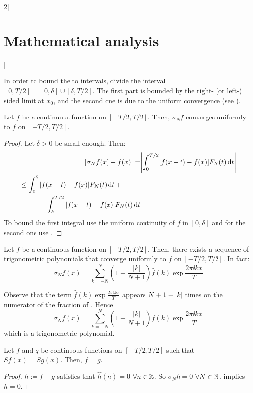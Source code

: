 \documentclass[../../../main_math.tex]{subfiles}
\begin{document}
\begin{multicols}{2}[\section{Mathematical analysis}]
\begin{sproof}
    In order to bound the to intervals, divide the interval $[0,T/2]=[0,\delta]\cup[\delta,T/2]$. The first part is bounded by the right- (or left-) sided limit at $x_0$, and the second one is due to the uniform convergence (see ).
  \end{sproof}
  \begin{theorem}\label{MA:fejerthm}
    Let $f$ be a continuous function on $[-T/2,T/2]$. Then, $\sigma_Nf$ converges uniformly to $f$ on $[-T/2,T/2]$.
  \end{theorem}
  \begin{proof}
    Let $\delta>0$ be small enough. Then:
    \begin{align*}
      \abs{\sigma_Nf(x)-f(x)}= & \abs{\int_0^{T/2}[f(x-t)-f(x)]F_N(t)\dd{t}} \\
      \begin{split}
        & \leq \int_0^{\delta}\abs{f(x-t)-f(x)}F_N(t)\dd{t}+\\
        &\hspace{1cm}+\int_\delta^{T/2}\abs{f(x-t)-f(x)}F_N(t)\dd{t}
      \end{split}
    \end{align*}
    To bound the first integral use the uniform continuity of $f$ in $[0,\delta]$ and for the second one use .
  \end{proof}
  \begin{corollary}
    Let $f$ be a continuous function on $[-T/2,T/2]$. Then, there exists a sequence of trigonometric polynomials that converge uniformly to $f$ on $[-T/2,T/2]$. In fact: $$\sigma_Nf(x)=\sum_{k=-N}^N\left(1-\frac{|k|}{N+1}\right)\widehat{f}(k)\exp{\frac{2\pi\ii kx}{T}}$$
  \end{corollary}
  \begin{sproof}
    Observe that the term $\widehat{f}(k)\exp{\frac{2\pi \ii k x}{T}}$ appears $N+1 - \abs{k}$ times on the numerator of the fraction of . Hence
    $$\sigma_Nf(x)=\sum_{k=-N}^N\left(1-\frac{|k|}{N+1}\right)\widehat{f}(k)\exp{\frac{2\pi\ii kx}{T}}$$
    which is a trigonometric polynomial.
  \end{sproof}
  \begin{corollary}
    Let $f$ and $g$ be continuous functions on $[-T/2,T/2]$ such that $Sf(x)=Sg(x)$. Then, $f=g$.
  \end{corollary}
  \begin{proof}
    $h:=f-g$ satisfies that $\widehat{h}(n)=0$ $\forall n\in\mathbb{Z}$. So $\sigma_Nh=0$ $\forall N\in\mathbb{N}$.  implies $h=0$.
  \end{proof}

\end{multicols}
\end{document}
